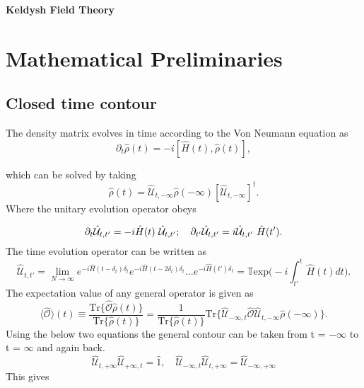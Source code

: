 \documentclass[a4paper, 12pt]{article}
\begin{document}
\begin{center} 
{\Huge{\textbf{Keldysh Field Theory}}}\\
\end{center}

\section {Mathematical Preliminaries}

\subsection {Closed time contour}

The density matrix evolves in time according to the Von Neumann equation as
\begin{equation}%
\partial_t \hat{\rho}(t) = -i [\hat{H}(t), \hat{\rho}(t)],
\end{equation}

which can be solved by taking 
\begin{equation}%
\hat{\rho}(t) = \hat{\mathcal{U}}_{t,-\infty}\hat{\rho}(-\infty) [\hat{\mathcal{U}}_{t,-\infty}]^{\dagger}.
\end{equation}
Where the unitary evolution operator obeys

\begin{equation}%
\partial_t \hat{\mathcal{U}}_{t,t'} = -i \hat{H}(t) \*\ \hat{\mathcal{U}}_{t,t'} ;\quad \partial_{t'} \hat{\mathcal{U}}_{t,t'} = i  \hat{\mathcal{U}}_{t,t'}\*\ \hat{H}(t') .
\end{equation}
The time evolution operator can be written as 
\begin{dmath}
\hat{\mathcal{U}}_{t,t'}  = \lim_{N \to \infty}e^{-i \hat{H}(t-\delta_t)\delta_t}e^{-i \hat{H}(t-2\delta_t)\delta_t}...e^{-i \hat{H}(t')\delta_t}  =\mathbb{T}\mathrm{exp}\bigg(-i \int_{t'}^t \hat{H}(t) dt \bigg).
\end{dmath}
The expectation value of any general operator is given as
\begin{equation}
\langle \hat{\mathcal{O}} \rangle (t) \equiv \frac{\mathrm{Tr}\{\hat{\mathcal{O}}\hat{\rho}(t)\}}{\mathrm{Tr}\{\hat{\rho}(t)\}} = \frac{1}{\mathrm{Tr}\{\hat{\rho}(t)\}} \mathrm{Tr}\{ \hat{\mathcal{U}}_{-\infty,t} \hat{\mathcal{O}} \hat{\mathcal{U}}_{t,-\infty} \hat{\rho}(-\infty)  \}.
\end{equation}
Using the below two equations the general contour can be taken from t = $-\infty$ to t = $\infty$ and again back.
\begin{equation}
\hat{\mathcal{U}}_{t,+\infty}\hat{\mathcal{U}}_{+\infty,t} = \hat{1}, \quad \hat{\mathcal{U}}_{-\infty,t}\hat{\mathcal{U}}_{t,+\infty} = \hat{\mathcal{U}}_{-\infty,+\infty}
\end{equation}
This gives 
\end{document}
